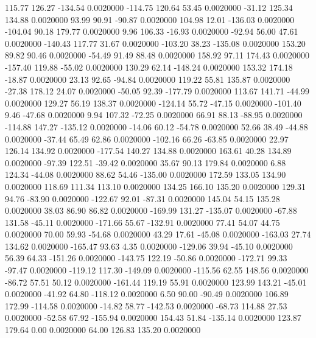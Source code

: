   115.77  126.27 -134.54   0.0020000
 -114.75  120.64   53.45   0.0020000
  -31.12  125.34  134.88   0.0020000
   93.99   90.91  -90.87   0.0020000
  104.98   12.01 -136.03   0.0020000
 -104.04   90.18  179.77   0.0020000
    9.96  106.33  -16.93   0.0020000
  -92.94   56.00   47.61   0.0020000
 -140.43  117.77   31.67   0.0020000
 -103.20   38.23 -135.08   0.0020000
  153.20   89.82   90.46   0.0020000
  -54.49   91.49   88.48   0.0020000
  158.92   97.11  174.43   0.0020000
 -157.40  119.88  -55.02   0.0020000
  130.29   62.14 -148.24   0.0020000
  153.32  174.18  -18.87   0.0020000
   23.13   92.65  -94.84   0.0020000
  119.22   55.81  135.87   0.0020000
  -27.38  178.12   24.07   0.0020000
  -50.05   92.39 -177.79   0.0020000
  113.67  141.71  -44.99   0.0020000
  129.27   56.19  138.37   0.0020000
 -124.14   55.72  -47.15   0.0020000
 -101.40    9.46  -47.68   0.0020000
    9.94  107.32  -72.25   0.0020000
   66.91   88.13  -88.95   0.0020000
 -114.88  147.27 -135.12   0.0020000
  -14.06   60.12  -54.78   0.0020000
   52.66   38.49  -44.88   0.0020000
  -37.44   65.49   62.86   0.0020000
 -102.16   66.26  -63.85   0.0020000
   22.97  126.14  134.92   0.0020000
 -177.54  140.27  134.88   0.0020000
  163.61   40.28  134.89   0.0020000
  -97.39  122.51  -39.42   0.0020000
   35.67   90.13  179.84   0.0020000
    6.88  124.34  -44.08   0.0020000
   88.62   54.46 -135.00   0.0020000
  172.59  133.05  134.90   0.0020000
  118.69  111.34  113.10   0.0020000
  134.25  166.10  135.20   0.0020000
  129.31   94.76  -83.90   0.0020000
 -122.67   92.01  -87.31   0.0020000
  145.04   54.15  135.28   0.0020000
   38.03   86.90   86.82   0.0020000
 -169.99  131.27 -135.07   0.0020000
  -67.88  131.58  -45.11   0.0020000
 -171.66   55.67 -132.91   0.0020000
   77.41   54.07   44.75   0.0020000
   70.00   59.93  -54.68   0.0020000
   43.29   17.61  -45.08   0.0020000
 -163.03   27.74  134.62   0.0020000
 -165.47   93.63    4.35   0.0020000
 -129.06   39.94  -45.10   0.0020000
   56.39   64.33 -151.26   0.0020000
 -143.75  122.19  -50.86   0.0020000
 -172.71   99.33  -97.47   0.0020000
 -119.12  117.30 -149.09   0.0020000
 -115.56   62.55  148.56   0.0020000
  -86.72   57.51   50.12   0.0020000
 -161.44  119.19   55.91   0.0020000
  123.99  143.21  -45.01   0.0020000
  -41.92   64.80 -118.12   0.0020000
    6.50   90.00  -90.49   0.0020000
  106.89  172.99 -114.58   0.0020000
  -14.82   58.77 -142.53   0.0020000
  -68.73  114.88   27.53   0.0020000
  -52.58   67.92 -155.94   0.0020000
  154.43   51.84 -135.14   0.0020000
  123.87  179.64    0.00   0.0020000
   64.00  126.83  135.20   0.0020000
